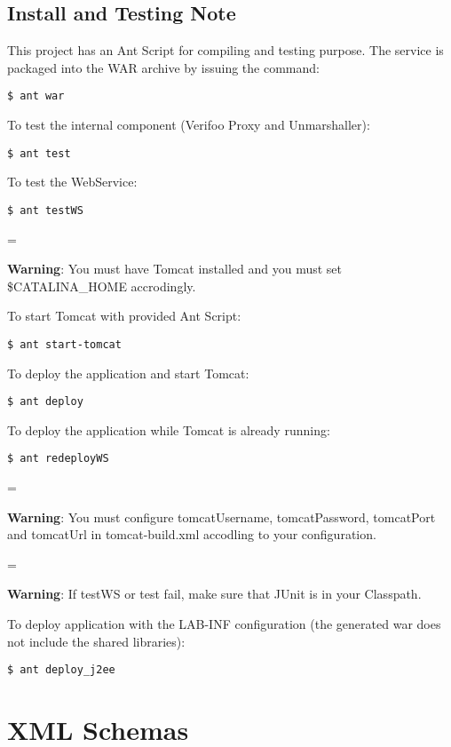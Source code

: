 \documentclass[a4paper,11pt]{article}
\newenvironment{warning}
  {\par\begin{mdframed}[backgroundcolor=mypink,linewidth=2pt,linecolor=red]%
    \begin{list}{}{\leftmargin=1cm
                   \labelwidth=\leftmargin}\item[\Large\ding{43}]}
  {\end{list}\end{mdframed}\par}
\begin{document}
\subsection{Install and Testing Note}
This project has an Ant Script for compiling and testing purpose.
The service is packaged into the WAR archive by issuing the command:
\begin{lstlisting}
$ ant war

\end{lstlisting}
To test the internal component (Verifoo Proxy and Unmarshaller):
\begin{lstlisting}
$ ant test

\end{lstlisting}
To test the WebService:
\begin{lstlisting}
$ ant testWS

\end{lstlisting}
\begin{warning}
\textbf{Warning}: You must have Tomcat installed and you must set \$CATALINA\_HOME accrodingly.
\end{warning}
To start Tomcat with provided Ant Script:
\begin{lstlisting}
$ ant start-tomcat

\end{lstlisting}
To deploy the application and start Tomcat: 
\begin{lstlisting}
$ ant deploy

\end{lstlisting}
To deploy the application while Tomcat is already running: 
\begin{lstlisting}
$ ant redeployWS

\end{lstlisting}
\begin{warning}
\textbf{Warning}: You must configure tomcatUsername, tomcatPassword, tomcatPort and tomcatUrl in tomcat-build.xml accodling to your configuration.
\end{warning}
\begin{warning}
\textbf{Warning}: If testWS or test fail, make sure that JUnit is in your Classpath.
\end{warning}
To deploy application with the LAB-INF configuration (the generated war does not include the shared libraries):
\begin{lstlisting}
$ ant deploy_j2ee

\end{lstlisting}

\newpage
\section{XML Schemas}
\end{document}
